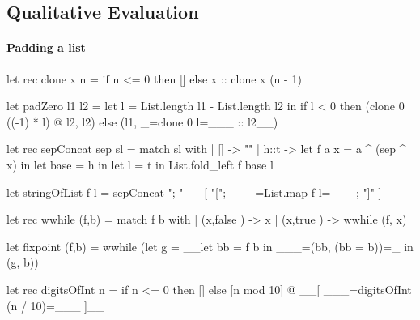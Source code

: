 \subsection{Qualitative Evaluation}
\label{sec:qualitative}

\paragraph{Padding a list}

\begin{ecode}
  let rec clone x n =
    if n <= 0 then
      []
    else
      x :: clone x (n - 1)

  let padZero l1 l2 =
    let l = List.length l1 - List.length l2 in
    if l < 0 then
      (clone 0 ((-1) * l) @ l2, l2)
    else
      (l1, _=clone 0 l=___ :: l2__)
\end{ecode}

\begin{ecode}
  let rec sepConcat sep sl =
    match sl with
    | [] -> ""
    | h::t ->
        let f a x = a ^ (sep ^ x) in
        let base = h in
        let l = t in
        List.fold_left f base l

  let stringOfList f l = sepConcat "; " __[ "["; ___=List.map f l=___; "]" ]__
\end{ecode}

\begin{ecode}
  let rec wwhile (f,b) =
    match f b with
    | (x,false ) -> x
    | (x,true ) -> wwhile (f, x)

  let fixpoint (f,b) =
    wwhile (let g = __let bb = f b in ___=(bb, (bb = b))=_ in (g, b))
\end{ecode}

\begin{ecode}
  let rec digitsOfInt n =
    if n <= 0 then
      []
    else
      [n mod 10] @ __[ ___=digitsOfInt (n / 10)=___ ]__
\end{ecode}

